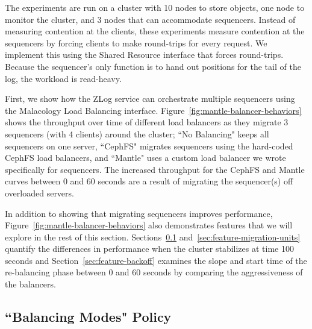 The experiments are run on a cluster with 10 nodes to store objects, one node
to monitor the cluster, and 3 nodes that can accommodate sequencers.  Instead
of measuring contention at the clients, these experiments measure
contention at the sequencers by forcing clients to make round-trips for every
request. We implement this using the Shared Resource interface that forces
round-trips.  Because the sequencer's only function is to  hand out positions
for the tail of the log, the workload is read-heavy.

First, we show how the ZLog service can orchestrate multiple sequencers using
the Malacology Load Balancing interface.
Figure~\ref{fig:mantle-balancer-behaviors} shows the throughput over time of
different load balancers as they migrate 3 sequencers (with 4 clients) around
the cluster; ``No Balancing" keeps all sequencers on one server, ``CephFS"
migrates sequencers using the hard-coded CephFS load balancers, and ``Mantle"
uses a custom load balancer we wrote specifically for sequencers.  The
increased throughput for the CephFS and Mantle curves between 0 and 60 seconds
are a result of migrating the sequencer(s) off overloaded servers.

In addition to showing that migrating sequencers improves performance,
Figure~\ref{fig:mantle-balancer-behaviors} also demonstrates features that we
will explore in the rest of this section.
Sections~\ref{sec:feature-balancing-modes}
and~\ref{sec:feature-migration-units} quantify the differences in performance
when the cluster stabilizes at time 100 seconds and
Section~\ref{sec:feature-backoff} examines the slope and start time of the
re-balancing phase between 0 and 60 seconds by comparing the aggressiveness of
the balancers.

\subsection{``Balancing Modes" Policy}
\label{sec:feature-balancing-modes}

